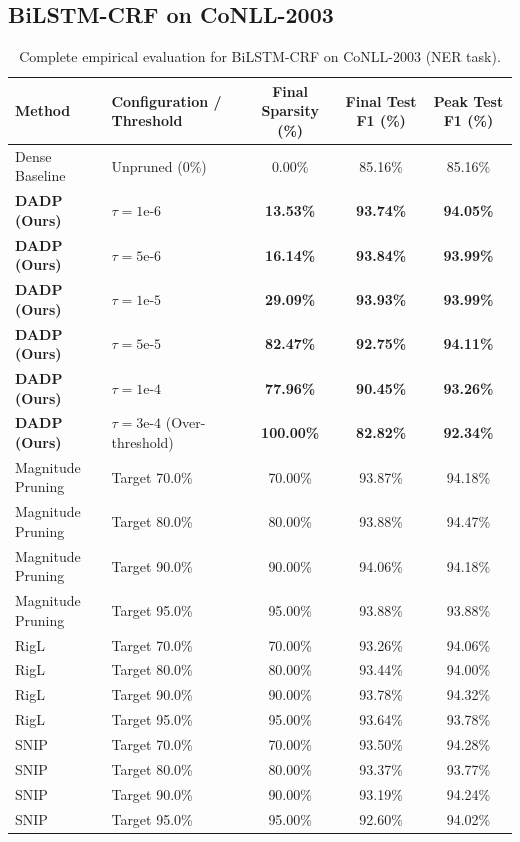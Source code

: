 \subsection{BiLSTM-CRF on CoNLL-2003}

\begin{table}[H]
\caption{Complete empirical evaluation for BiLSTM-CRF on CoNLL-2003 (NER task).}
\label{tab:app_bilstm_conll}
\centering
\small
\begin{tabular}{llccc}
\toprule
\textbf{Method} & \textbf{Configuration / Threshold} & \textbf{Final Sparsity (\%)} & \textbf{Final Test F1 (\%)} & \textbf{Peak Test F1 (\%)} \\
\midrule
Dense Baseline & Unpruned (0\%) & 0.00\% & 85.16\% & 85.16\% \\
\textbf{DADP (Ours)} & $\tau = 1\text{e-}6$ & \textbf{13.53\%} & \textbf{93.74\%} & \textbf{94.05\%} \\
\textbf{DADP (Ours)} & $\tau = 5\text{e-}6$ & \textbf{16.14\%} & \textbf{93.84\%} & \textbf{93.99\%} \\
\textbf{DADP (Ours)} & $\tau = 1\text{e-}5$ & \textbf{29.09\%} & \textbf{93.93\%} & \textbf{93.99\%} \\
\textbf{DADP (Ours)} & $\tau = 5\text{e-}5$ & \textbf{82.47\%} & \textbf{92.75\%} & \textbf{94.11\%} \\
\textbf{DADP (Ours)} & $\tau = 1\text{e-}4$ & \textbf{77.96\%} & \textbf{90.45\%} & \textbf{93.26\%} \\
\textbf{DADP (Ours)} & $\tau = 3\text{e-}4$ (Over-threshold) & \textbf{100.00\%} & \textbf{82.82\%} & \textbf{92.34\%} \\
\midrule
Magnitude Pruning & Target 70.0\% & 70.00\% & 93.87\% & 94.18\% \\
Magnitude Pruning & Target 80.0\% & 80.00\% & 93.88\% & 94.47\% \\
Magnitude Pruning & Target 90.0\% & 90.00\% & 94.06\% & 94.18\% \\
Magnitude Pruning & Target 95.0\% & 95.00\% & 93.88\% & 93.88\% \\
\midrule
RigL & Target 70.0\% & 70.00\% & 93.26\% & 94.06\% \\
RigL & Target 80.0\% & 80.00\% & 93.44\% & 94.00\% \\
RigL & Target 90.0\% & 90.00\% & 93.78\% & 94.32\% \\
RigL & Target 95.0\% & 95.00\% & 93.64\% & 93.78\% \\
\midrule
SNIP & Target 70.0\% & 70.00\% & 93.50\% & 94.28\% \\
SNIP & Target 80.0\% & 80.00\% & 93.37\% & 93.77\% \\
SNIP & Target 90.0\% & 90.00\% & 93.19\% & 94.24\% \\
SNIP & Target 95.0\% & 95.00\% & 92.60\% & 94.02\% \\
\bottomrule
\end{tabular}
\end{table}

